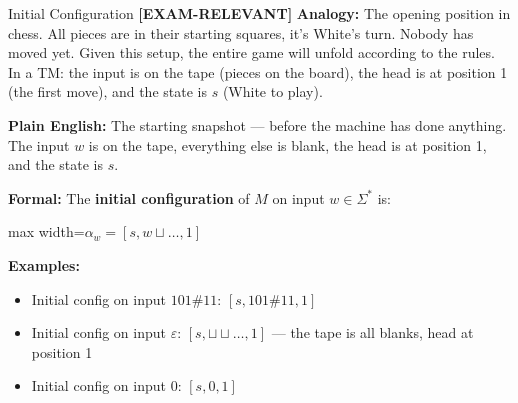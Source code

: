 \documentclass[11pt,a4paper]{article}
\newcommand{\fitmath}[1]{\begin{adjustbox}{max width=\linewidth}$\displaystyle #1$\end{adjustbox}}
\newcommand{\kemark}{\textcolor{red!70!black}{\textbf{[EXAM-RELEVANT]}}}
\begin{document}
\begin{definitionbox}{Initial Configuration \kemark}
\textbf{Analogy:} The opening position in chess. All pieces are in their starting squares, it's White's turn. Nobody has moved yet. Given this setup, the entire game will unfold according to the rules. In a TM: the input is on the tape (pieces on the board), the head is at position 1 (the first move), and the state is $s$ (White to play).

\textbf{Plain English:} The starting snapshot --- before the machine has done anything. The input $w$ is on the tape, everything else is blank, the head is at position 1, and the state is $s$.

\textbf{Formal:} The \textbf{initial configuration} of $M$ on input $w \in \Sigma^*$ is:
\fitmath{\alpha_w = [s, w\sqcup\ldots, 1]}

\textbf{Examples:}
\begin{itemize}[nosep]
\item Initial config on input $101\#11$: $[s, 101\#11, 1]$
\item Initial config on input $\varepsilon$: $[s, \sqcup\sqcup\ldots, 1]$ --- the tape is all blanks, head at position 1
\item Initial config on input $0$: $[s, 0, 1]$
\end{itemize}
\end{definitionbox}
\end{document}
